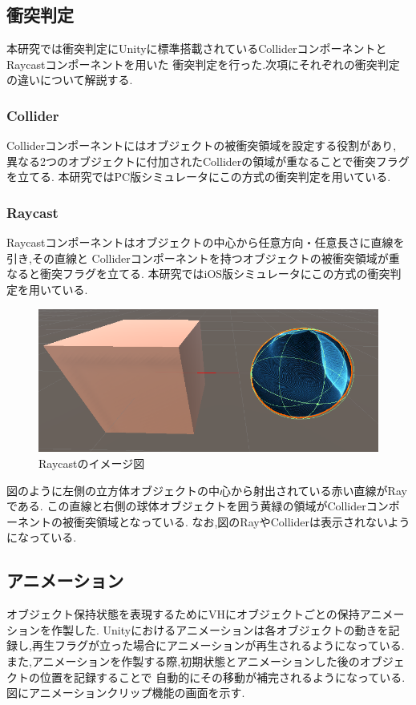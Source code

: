 \documentclass{ltjsreport}
\begin{document}
		\subsection{衝突判定}
			本研究では衝突判定にUnityに標準搭載されているColliderコンポーネントとRaycastコンポーネントを用いた
			衝突判定を行った.次項にそれぞれの衝突判定の違いについて解説する.

			\subsubsection{Collider}
				Colliderコンポーネントにはオブジェクトの被衝突領域を設定する役割があり,
				異なる2つのオブジェクトに付加されたColliderの領域が重なることで衝突フラグを立てる.
				本研究ではPC版シミュレータにこの方式の衝突判定を用いている.

			\subsubsection{Raycast}
				Raycastコンポーネントはオブジェクトの中心から任意方向・任意長さに直線を引き,その直線と
				Colliderコンポーネントを持つオブジェクトの被衝突領域が重なると衝突フラグを立てる.
				本研究ではiOS版シミュレータにこの方式の衝突判定を用いている.
			\begin{figure}[H]
			\centering
			\includegraphics[width = 12cm]{../figs/raycast.png}
			\caption{Raycastのイメージ図}
			\label{fig:Raycast}
			\end{figure}
\vspace{-15pt}
			図のように左側の立方体オブジェクトの中心から射出されている赤い直線がRayである.
			この直線と右側の球体オブジェクトを囲う黄緑の領域がColliderコンポーネントの被衝突領域となっている.
			なお,図のRayやColliderは表示されないようになっている.

		\subsection{アニメーション}
			オブジェクト保持状態を表現するためにVHにオブジェクトごとの保持アニメーションを作製した.
			Unityにおけるアニメーションは各オブジェクトの動きを記録し,再生フラグが立った場合にアニメーションが再生されるようになっている.
			また,アニメーションを作製する際,初期状態とアニメーションした後のオブジェクトの位置を記録することで
			自動的にその移動が補完されるようになっている.図にアニメーションクリップ機能の画面を示す.
\end{document}
